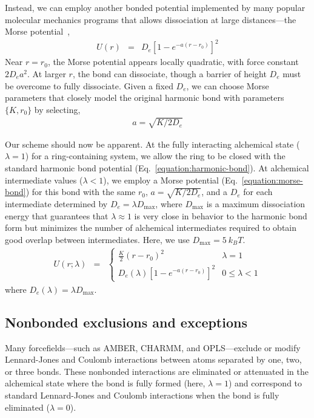 \documentclass[aps,pre,twocolumn,superscriptaddress,nofootinbib]{revtex4-1}
\begin{document}
Instead, we can employ another bonded potential implemented by many popular molecular mechanics programs that allows dissociation at large distances---the Morse potential~\cite{morse:phys-rev:1929:morse-potential},
\begin{eqnarray}
U(r) &=& D_e [1 - e^{-a (r - r_0)}]^2 \label{equation:morse-bond}
\end{eqnarray}
Near $r = r_0$, the Morse potential appears locally quadratic, with force constant $2 D_e a^2$.
At larger $r$, the bond can dissociate, though a barrier of height $D_e$ must be overcome to fully dissociate.
Given a fixed $D_e$, we can choose Morse parameters that closely model the original harmonic bond with parameters $\{K, r_0\}$ by selecting,
\begin{eqnarray}
a = \sqrt{K / 2 D_e} \label{equation:morse-a}
\end{eqnarray}

Our scheme should now be apparent. 
At the fully interacting alchemical state ($\lambda = 1$) for a ring-containing system, we allow the ring to be closed with the standard harmonic bond potential (Eq.~\ref{equation:harmonic-bond}).
At alchemical intermediate values ($\lambda < 1$), we employ a Morse potential (Eq.~\ref{equation:morse-bond}) for this bond with the same $r_0$, $a = \sqrt{K / 2 D_e}$, and a $D_e$ for each intermediate determined by $D_e = \lambda D_\mathrm{max}$, where $D_\mathrm{max}$ is a maximum dissociation energy that guarantees that $\lambda \approx 1$ is very close in behavior to the harmonic bond form but minimizes the number of alchemical intermediates required to obtain good overlap between intermediates.
Here, we use $D_\mathrm{max} = 5 \: k_B T$.
\begin{eqnarray}
U(r;\lambda) &=& \begin{cases}
\frac{K}{2} (r - r_0)^2 & \lambda = 1 \\
D_e(\lambda) [1 - e^{-a (r - r_0)}]^2 & 0 \le \lambda < 1
\end{cases}
\end{eqnarray}
where $D_e(\lambda) = \lambda D_\mathrm{max}$.

\subsection{Nonbonded exclusions and exceptions}
\label{section:nonbonded-exclusions-and-exceptions}

Many forcefields---such as AMBER, CHARMM, and OPLS---exclude or modify Lennard-Jones and Coulomb interactions between atoms separated by one, two, or three bonds.
These nonbonded interactions are eliminated or attenuated in the alchemical state where the bond is fully formed (here, $\lambda = 1$) and correspond to standard Lennard-Jones and Coulomb interactions when the bond is fully eliminated ($\lambda = 0$).
\end{document}
